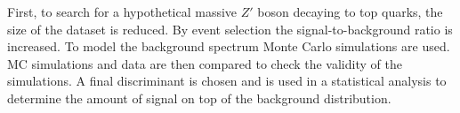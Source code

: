 First, to search for a hypothetical massive $Z'$ boson decaying to top quarks, the size of the dataset is reduced. By event selection the signal-to-background ratio is increased. To model the background spectrum Monte Carlo simulations are used. MC simulations and data are then compared to check the validity of the simulations. A final discriminant is chosen and is used in a statistical analysis to determine the amount of signal on top of the background distribution.
